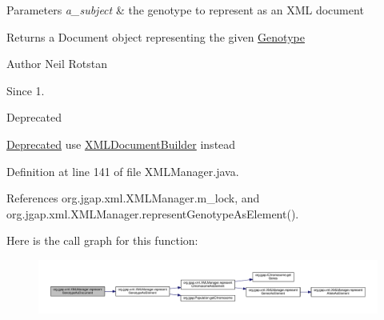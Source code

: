 \begin{DoxyParams}{Parameters}
{\em a\-\_\-subject} & the genotype to represent as an X\-M\-L document \\
\hline
\end{DoxyParams}
\begin{DoxyReturn}{Returns}
a Document object representing the given \hyperlink{classorg_1_1jgap_1_1_genotype}{Genotype}
\end{DoxyReturn}
\begin{DoxyAuthor}{Author}
Neil Rotstan 
\end{DoxyAuthor}
\begin{DoxySince}{Since}
1. 
\end{DoxySince}
\begin{DoxyRefDesc}{Deprecated}
\item[\hyperlink{deprecated__deprecated000012}{Deprecated}]use \hyperlink{classorg_1_1jgap_1_1xml_1_1_x_m_l_document_builder}{X\-M\-L\-Document\-Builder} instead \end{DoxyRefDesc}


Definition at line 141 of file X\-M\-L\-Manager.\-java.



References org.\-jgap.\-xml.\-X\-M\-L\-Manager.\-m\-\_\-lock, and org.\-jgap.\-xml.\-X\-M\-L\-Manager.\-represent\-Genotype\-As\-Element().



Here is the call graph for this function\-:
\nopagebreak
\begin{figure}[H]
\begin{center}
\leavevmode
\includegraphics[width=350pt]{classorg_1_1jgap_1_1xml_1_1_x_m_l_manager_af51f0db3ed6f03635b9b4dbb286bd08d_cgraph}
\end{center}
\end{figure}


